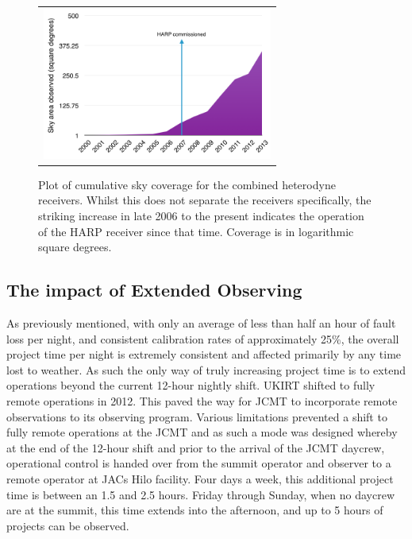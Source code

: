 \documentclass[]{spie}  %
\begin{document}
\begin{figure}[h]
   \begin{center}
   \begin{tabular}{c}
   \includegraphics[height=5cm]{heterodyne_areacover.png}
   \end{tabular}
   \end{center}
   \caption{\label{fig:het} Plot of cumulative sky coverage for the combined heterodyne receivers. Whilst this does not separate the receivers specifically, the striking increase in late 2006 to the present indicates the operation of the HARP receiver since that time. Coverage is in logarithmic square degrees.}
\end{figure}

\subsection{The impact of Extended Observing}\label{sec:eo}


As previously mentioned, with only an average of less than half an
hour of fault loss per night, and consistent calibration rates of
approximately 25$\%$, the overall project time per night is extremely
consistent and affected primarily by any time lost to weather. As such
the only way of truly increasing project time is to extend operations
beyond the current 12-hour nightly shift. UKIRT shifted to fully
remote operations in 2012.\cite{2012SPIE.8448E..1GK} This paved the way for JCMT to
incorporate remote observations to its observing program.\cite{2014SPIE9149-93} Various
limitations prevented a shift to fully remote operations at the JCMT
and as such a mode was designed whereby at the end of the 12-hour
shift and prior to the arrival of the JCMT daycrew, operational
control is handed over from the summit operator and observer to a
remote operator at JACs Hilo facility. Four days a week, this
additional project time is between an 1.5 and 2.5 hours. Friday
through Sunday, when no daycrew are at the summit, this time extends
into the afternoon, and up to 5 hours of projects can be observed.
\end{document}
